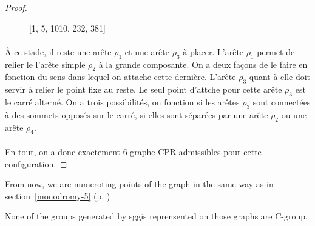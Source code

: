 \begin{proof}
\begin{figure}[H]
\begin{center}
\begin{tikzpicture}
    \end{tikzpicture}
    \caption{[1, 5, 1010, 232, 381]}
  \end{center}
\end{figure}

\paragraph{}
À ce stade, il reste une arête $\rho_1$ et une arête $\rho_3$ à placer. L'arête $\rho_1$ permet de relier le l'arête simple $\rho_2$ à la grande composante. On a deux façons de le faire en fonction du sens dans lequel on attache cette dernière. L'arête $\rho_3$ quant à elle doit servir à relier le point fixe au reste. Le seul point d'attche pour cette arête $\rho_3$ est le carré alterné. On a trois possibilités, on fonction si les arêtes $\rho_3$ sont connectées à des sommets opposés sur le carré, si elles sont séparées par une arête $\rho_2$ ou une arête $\rho_4$.

\paragraph{}
En tout, on a donc exactement 6 graphe CPR admissibles pour cette configuration.

\end{proof}

From now, we are numeroting points of the graph in the same way as in section~\ref{monodromy-5} (p. \pageref{monodromy-5})

\begin{theorem}
  None of the groups generated by sggis reprensented on those graphs are C-group.
\end{theorem}

